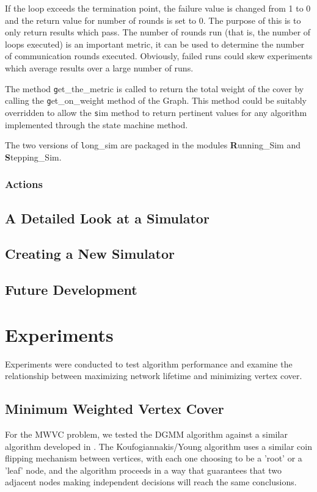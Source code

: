 If the loop exceeds the termination point, the failure value is changed from 1 to 0 and the return value for number of rounds is set to 0. The purpose of this is to only return results which pass. The number of rounds run (that is, the number of loops executed) is an important metric, it can be used to determine the number of communication rounds executed. Obviously, failed runs could skew experiments which average results over a large number of runs.

The method {\texttt get\_the\_metric} is called to return the total weight of the cover by calling the {\texttt get\_on\_weight} method of the Graph. This method could be suitably overridden to allow the {\texttt sim} method to return pertinent values for any algorithm implemented through the state machine method.

The two versions of {\texttt long\_sim} are packaged in the modules {\textbf Running\_Sim} and {\textbf Stepping\_Sim}. 
\subsubsection{Actions}
\label{sec:sim-modules-actions}

\subsection{A Detailed Look at a Simulator}
\label{sec:sim-detail}
\subsection{Creating a New Simulator}
\label{sec:sim-new}
\subsection{Future Development}
\label{sec:sim-future}

\section{Experiments}
\label{sec:experiments}
Experiments were conducted to test algorithm performance and examine the relationship between maximizing network lifetime and minimizing vertex cover.
\subsection{Minimum Weighted Vertex Cover}
\label{sub:mwvc-exp}

For the MWVC problem, we tested the DGMM algorithm against a similar algorithm developed in \cite{1582746}. The Koufogiannakis/Young algorithm uses a similar coin flipping mechanism between vertices, with each one choosing to be a 'root' or a 'leaf' node, and the algorithm proceeds in a way that guarantees that two adjacent nodes making independent decisions will reach the same conclusions. 

